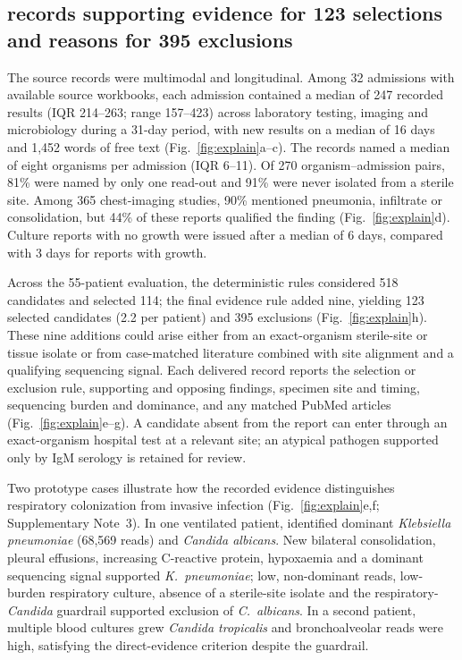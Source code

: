 \subsection*{\toolname records supporting evidence for 123 selections and reasons for 395 exclusions}

The source records were multimodal and longitudinal. Among 32 \kmuh admissions with available source workbooks, each admission contained a median of 247 recorded results (IQR 214--263; range 157--423) across laboratory testing, imaging and microbiology during a 31-day period, with new results on a median of 16 days and 1,452 words of free text (Fig.~\ref{fig:explain}a--c). The records named a median of eight organisms per admission (IQR 6--11). Of 270 organism--admission pairs, 81\% were named by only one read-out and 91\% were never isolated from a sterile site. Among 365 chest-imaging studies, 90\% mentioned pneumonia, infiltrate or consolidation, but 44\% of these reports qualified the finding (Fig.~\ref{fig:explain}d). Culture reports with no growth were issued after a median of 6 days, compared with 3 days for reports with growth.

Across the 55-patient evaluation, the deterministic rules considered 518 candidates and selected 114; the final evidence rule added nine, yielding 123 selected candidates (2.2 per patient) and 395 exclusions (Fig.~\ref{fig:explain}h). These nine additions could arise either from an exact-organism sterile-site or tissue isolate or from case-matched literature combined with site alignment and a qualifying sequencing signal. Each delivered record reports the selection or exclusion rule, supporting and opposing findings, specimen site and timing, sequencing burden and dominance, and any matched PubMed articles (Fig.~\ref{fig:explain}e--g). A candidate absent from the \mngs report can enter through an exact-organism hospital test at a relevant site; an atypical pathogen supported only by IgM serology is retained for review. 

Two prototype cases illustrate how the recorded evidence distinguishes respiratory colonization from invasive infection (Fig.~\ref{fig:explain}e,f; Supplementary Note~3). In one ventilated patient, \mngs identified dominant \textit{Klebsiella pneumoniae} (68,569 reads) and \textit{Candida albicans}. New bilateral consolidation, pleural effusions, increasing C-reactive protein, hypoxaemia and a dominant sequencing signal supported \textit{K.~pneumoniae}; low, non-dominant reads, low-burden respiratory culture, absence of a sterile-site isolate and the respiratory-\textit{Candida} guardrail supported exclusion of \textit{C.~albicans}. In a second patient, multiple blood cultures grew \textit{Candida tropicalis} and bronchoalveolar reads were high, satisfying the direct-evidence criterion despite the guardrail. 


